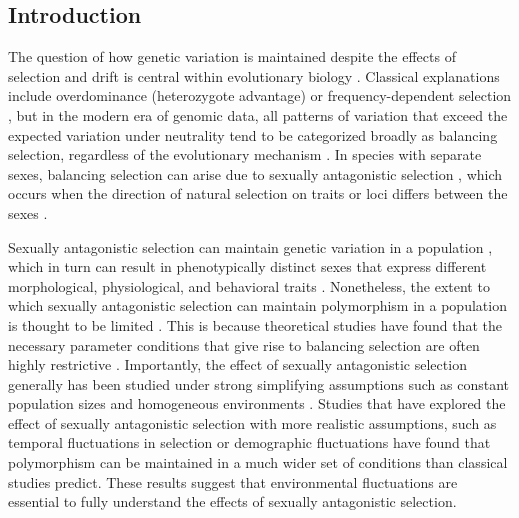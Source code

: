 \begin{refsection}
\section*{Introduction}
The question of how genetic variation is maintained despite the effects of selection and drift is central within evolutionary biology \citep{walsh_evolution_2018}. Classical explanations include overdominance (heterozygote advantage) or frequency-dependent selection \citep{hedrick2007balancing}, but in the modern era of genomic data, all patterns of variation that exceed the expected variation under neutrality tend to be categorized broadly as balancing selection, regardless of the evolutionary mechanism \citep{mitchell-olds_which_2007}. In species with separate sexes, balancing selection can arise due to sexually antagonistic selection \citep{connallon2014balancing}, which occurs when the direction of natural selection on traits or loci differs between the sexes \citep{lande1980sexual,arnqvist2013sexual}.

Sexually antagonistic selection can maintain genetic variation in a population \citep{chippindale2001negative,gavrilets2014sexual}, which in turn can result in phenotypically distinct sexes that express different morphological, physiological, and behavioral traits \citep{mori2017sexual,connallon2018environmental}. Nonetheless,
the extent to which sexually antagonistic selection can maintain polymorphism in a population is thought to be limited \citep{connallon2012general,connallon2018environmental}. This is because theoretical studies have found that the necessary parameter conditions that give rise to balancing selection are often highly restrictive \citep{kidwell1977regions,pamilo1979genic,hedrick1999antagonistic,curtsinger1994antagonistic}. Importantly, the effect of sexually antagonistic selection generally has been studied under strong simplifying assumptions such as constant population sizes and homogeneous environments  \citep{kidwell1977regions, pamilo1979genic, immler2012ploidally}. Studies that have explored the effect of sexually antagonistic selection with more realistic assumptions, such as temporal fluctuations in selection \citep{connallon2018environmental} or demographic fluctuations \citep{connallon2012general} have found that polymorphism can be maintained in a much wider set of conditions than classical studies predict. These results suggest that environmental fluctuations are essential to fully understand the effects of sexually antagonistic selection.


\end{refsection}
